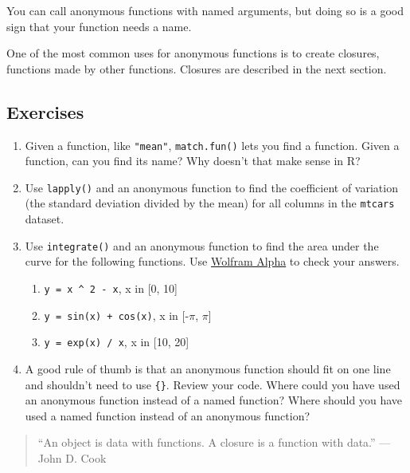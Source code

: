 You can call anonymous functions with named arguments, but doing so is a
good sign that your function needs a name.

One of the most common uses for anonymous functions is to create
closures, functions made by other functions. Closures are described in
the next section.

\subsection{Exercises}

\begin{enumerate}
\def\labelenumi{\arabic{enumi}.}
\item
  Given a function, like \texttt{"mean"}, \texttt{match.fun()} lets you
  find a function. Given a function, can you find its name? Why doesn't
  that make sense in R?
\item
  Use \texttt{lapply()} and an anonymous function to find the
  coefficient of variation (the standard deviation divided by the mean)
  for all columns in the \texttt{mtcars} dataset.
\item
  Use \texttt{integrate()} and an anonymous function to find the area
  under the curve for the following functions. Use
  \href{http://www.wolframalpha.com/}{Wolfram Alpha} to check your
  answers.

  \begin{enumerate}
  \def\labelenumii{\arabic{enumii}.}
  \itemsep1pt\parskip0pt
  \item
    \texttt{y = x \^{} 2 - x}, x in {[}0, 10{]}
  \item
    \texttt{y = sin(x) + cos(x)}, x in {[}-$\pi$, $\pi${]}
  \item
    \texttt{y = exp(x) / x}, x in {[}10, 20{]}
  \end{enumerate}
\item
  A good rule of thumb is that an anonymous function should fit on one
  line and shouldn't need to use \texttt{\{\}}. Review your code. Where
  could you have used an anonymous function instead of a named function?
  Where should you have used a named function instead of an anonymous
  function?
\end{enumerate}


\begin{quote}
``An object is data with functions. A closure is a function with data.''
--- John D. Cook
\end{quote}

